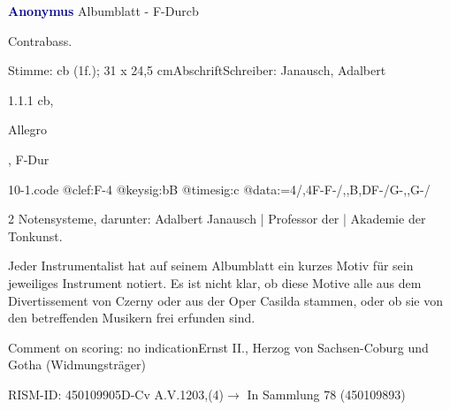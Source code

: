 \documentclass[a4paper, twocolumn, 11pt]{book}
\begin{document}
\par \vspace{16pt} \textcolor{darkblue}{\textbf{Anonymus  }}\hfillplus{[10]}\newline Albumblatt - F-Dur\newline cb
\par \begin{itshape}[heading:] Contrabass.\end{itshape} 
\par \textcolor{darkblue}{}  Stimme: cb  (1f.); 31 x 24,5 cm\newline Abschrift\newline Schreiber: Janausch, Adalbert
\par 1.1.1  cb, \begin{itshape}Allegro\end{itshape}, F-Dur  
\begin{filecontents*}{10-1.code}
@clef:F-4
@keysig:bB
@timesig:c
@data:=4/,4F-F-/,,B,DF-/G-,,G-/
\end{filecontents*}
\newline %
\par 2 Notensysteme, darunter: Adalbert Janausch | Professor der | Akademie der Tonkunst.
\par Jeder Instrumentalist hat auf seinem Albumblatt ein kurzes Motiv für sein jeweiliges Instrument notiert. Es ist nicht klar, ob diese Motive alle aus dem {\textquotedbl}Divertissement{\textquotedbl} von Czerny oder aus der Oper {\textquotedbl}Casilda{\textquotedbl} stammen, oder ob sie von den betreffenden Musikern frei erfunden sind.
\par Comment on scoring: no indication\newline Ernst II., Herzog von Sachsen-Coburg und Gotha  (Widmungsträger)
\par RISM-ID: 450109905\newline D-Cv  A.V.1203,(4)\newline $\rightarrow$ In Sammlung 78 (450109893)
      
\end{document}
